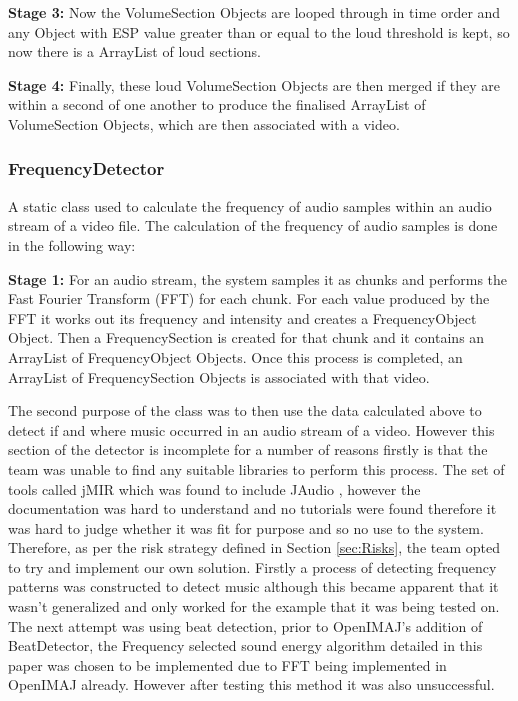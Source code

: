 \textbf{Stage 3:} Now the VolumeSection Objects are looped through in time order and any Object with ESP value greater than or equal to the loud threshold is kept, so now there is a ArrayList of loud sections.

\textbf{Stage 4:} Finally, these loud VolumeSection Objects are then merged if they are within a second of one another to produce the finalised ArrayList of VolumeSection Objects, which are then associated with a video. 

\subsubsection{FrequencyDetector}
A static class used to calculate the frequency of audio samples within an audio stream of a video file. The calculation of the frequency of audio samples is done in the following way:

\textbf{Stage 1:} For an audio stream, the system samples it as chunks and performs the Fast Fourier Transform (FFT) for each chunk. For each value produced by the FFT it works out its frequency and intensity and creates a FrequencyObject Object. Then a FrequencySection is created for that chunk and it contains an ArrayList of FrequencyObject Objects. Once this process is completed, an ArrayList of FrequencySection Objects is associated with that video.

The second purpose of the class was to then use the data calculated above to detect if and where music occurred in an audio stream of a video. However this section of the detector is incomplete for a 
number of reasons firstly is that the team was unable to find any suitable libraries to perform this process. The set of tools called 
jMIR \cite{JMIR} which was found to include JAudio \cite{JAudio}, however the documentation was hard to understand and no tutorials were found therefore it 
was hard to judge whether it was fit for purpose and so no use to the system. Therefore, as per the risk strategy defined in Section \ref{sec:Risks}, the team opted to try 
and implement our own solution. Firstly a process of detecting frequency patterns was constructed to detect music although this became apparent 
that it wasn’t generalized and only worked for the example that it was being tested on. The next attempt was using beat detection, prior to 
OpenIMAJ’s addition of BeatDetector, the Frequency selected sound energy algorithm detailed in this paper \cite{BeatDetection} was chosen to be 
implemented due to FFT being implemented in OpenIMAJ already. However after testing this method it was also unsuccessful. 

